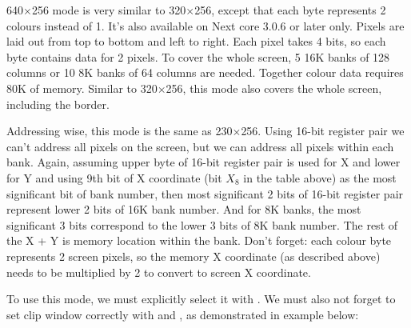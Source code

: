 640$\times$256 mode is very similar to 320$\times$256, except that each byte represents 2 colours instead of 1. It's also available on Next core 3.0.6 or later only. Pixels are laid out from top to bottom and left to right. Each pixel takes 4 bits, so each byte contains data for 2 pixels. To cover the whole screen, 5 16K banks of 128 columns or 10 8K banks of 64 columns are needed. Together colour data requires 80K of memory. Similar to 320$\times$256, this mode also covers the whole screen, including the border.

Addressing wise, this mode is the same as 230$\times$256. Using 16-bit register pair we can't address all pixels on the screen, but we can address all pixels within each bank. Again, assuming upper byte of 16-bit register pair is used for X and lower for Y and using 9th bit of X coordinate (bit $X_8$ in the table above) as the most significant bit of bank number, then most significant 2 bits of 16-bit register pair represent lower 2 bits of 16K bank number. And for 8K banks, the most significant 3 bits correspond to the lower 3 bits of 8K bank number. The rest of the X + Y is memory location within the bank. Don't forget: each colour byte represents 2 screen pixels, so the memory X coordinate (as described above) needs to be multiplied by 2 to convert to screen X coordinate.

To use this mode, we must explicitly select it with . We must also not forget to set clip window correctly with  and , as demonstrated in example below:

